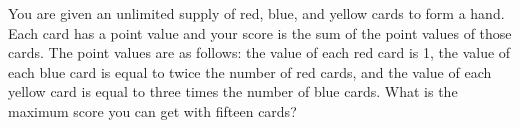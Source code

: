 You are given an unlimited supply of red, blue, and yellow cards to form a hand. Each card has a point value and your score is the sum of the point values of those cards. The point values are as follows: the value of each red card is 1, the value of each blue card is equal to twice the number of red cards, and the value of each yellow card is equal to three times the number of blue cards. What is the maximum score you can get with ﬁfteen cards?
